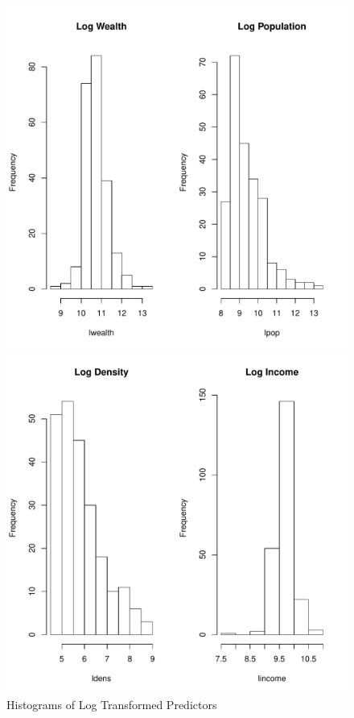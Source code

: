 \documentclass{article}\usepackage[]{graphicx}\usepackage[]{color}
\makeatletter
\def\maxwidth{ %
  \ifdim\Gin@nat@width>\linewidth
    \linewidth
  \else
    \Gin@nat@width
  \fi
}
\newenvironment{knitrout}{}{} %
\makeatother
\begin{document}
\begin{figure}
  \begin{center}
    \caption{Histograms of Log Transformed Predictors}
      \label{transformed}
\begin{knitrout}
\color{fgcolor}
\includegraphics[width=\maxwidth,height=0.3\textheight]{figure/Log_Transformed_Predictors-1} 

\includegraphics[width=\maxwidth,height=0.3\textheight]{figure/Log_Transformed_Predictors-2} 


\end{knitrout}
\end{center}
\end{figure}
\end{document}
